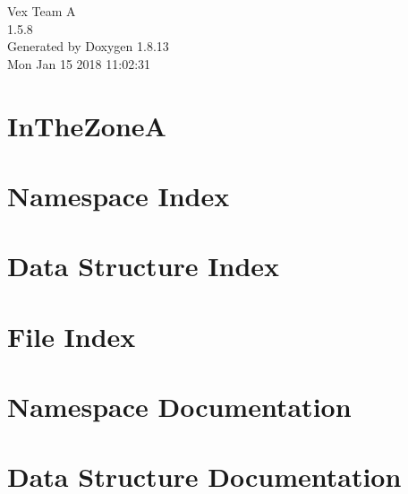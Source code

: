 \documentclass[twoside]{article}
\newcommand{\+}{\discretionary{\mbox{\scriptsize$\hookleftarrow$}}{}{}}
\begin{document}
\begin{titlepage}
\vspace*{7cm}
\begin{center}%
{\Large Vex Team A \\[1ex]\large 1.\+5.\+8 }\\
\vspace*{1cm}
{\large Generated by Doxygen 1.8.13}\\
\vspace*{0.5cm}
{\small Mon Jan 15 2018 11:02:31}\\
\end{center}
\end{titlepage}
\tableofcontents
{}

\section{In\+The\+ZoneA}
\label{md__r_e_a_d_m_e}

\section{Namespace Index}

\section{Data Structure Index}

\section{File Index}

\section{Namespace Documentation}

\section{Data Structure Documentation}












\end{document}
